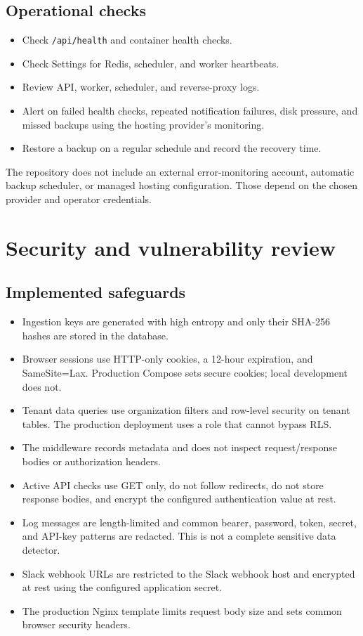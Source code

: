 \documentclass[11pt,a4paper]{article}
\begin{document}
\subsection{Operational checks}
\begin{itemize}
  \item Check \texttt{/api/health} and container health checks.
  \item Check Settings for Redis, scheduler, and worker heartbeats.
  \item Review API, worker, scheduler, and reverse-proxy logs.
  \item Alert on failed health checks, repeated notification failures, disk
  pressure, and missed backups using the hosting provider's monitoring.
  \item Restore a backup on a regular schedule and record the recovery time.
\end{itemize}

The repository does not include an external error-monitoring account, automatic
backup scheduler, or managed hosting configuration. Those depend on the chosen
provider and operator credentials.

\section{Security and vulnerability review}

\subsection{Implemented safeguards}
\begin{itemize}
  \item Ingestion keys are generated with high entropy and only their SHA-256
  hashes are stored in the database.
  \item Browser sessions use HTTP-only cookies, a 12-hour expiration, and
  SameSite=Lax. Production Compose sets secure cookies; local development does
  not.
  \item Tenant data queries use organization filters and row-level security on
  tenant tables. The production deployment uses a role that cannot bypass RLS.
  \item The middleware records metadata and does not inspect request/response
  bodies or authorization headers.
  \item Active API checks use GET only, do not follow redirects, do not store
  response bodies, and encrypt the configured authentication value at rest.
  \item Log messages are length-limited and common bearer, password, token,
  secret, and API-key patterns are redacted. This is not a complete sensitive
  data detector.
  \item Slack webhook URLs are restricted to the Slack webhook host and
  encrypted at rest using the configured application secret.
  \item The production Nginx template limits request body size and sets common
  browser security headers.
\end{itemize}
\end{document}
